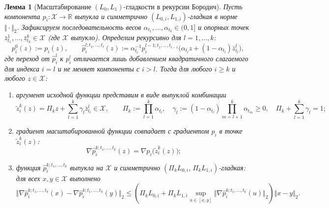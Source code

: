 \documentclass[11pt, a4paper]{article}
\newtheorem{lemma}{Лемма}[section]
\theoremstyle{definition}
\begin{document}
\begin{lemma}[Масштабирование $(L_0, L_1)$-гладкости в рекурсии Бородич]\label{lem:scaling_invariance}
Пусть компонента $p_i : \mathcal{X} \to \mathbb{R}$ выпукла и симметрично $(L_{0,i}, L_{1,i})$-гладкая в норме $\Vert \cdot \Vert_2$. Зафиксируем последовательность весов $\alpha_{t_1}, \dots, \alpha_{t_k} \in (0, 1]$ и опорных точек $\bar{z}_{t_1}^1, \dots, \bar{z}_{t_k}^k \in \mathcal{X}$ (где $\mathcal{X}$ выпукло). Определим рекурсивно для $l = 1, \dots, k$:
\[
p_i^{0}(z) := p_i(z), \qquad \hat{p}_i^{l; t_1, \dots, t_l}(z) := \alpha_{t_l}^{-1} p_i^{l-1; t_1, \dots, t_{l-1}}\big(\alpha_{t_l} z + (1 - \alpha_{t_l}) \bar{z}_{t_l}^l\big),
\]
где переход от $\hat{p}_i^{l}$ к $p_i^{l}$ отличается лишь добавлением квадратичного слагаемого для индекса $i = l$ и не меняет компоненты с $i > l$. Тогда для любого $i \ge k$ и любого $z \in \mathcal{X}$:
\begin{enumerate}
    \item аргумент исходной функции представим в виде выпуклой комбинации
    \begin{equation}\label{eq:convex_comb_tilde}
    \tilde{z}_i^k(z) = \Pi_k z + \sum_{l=1}^k \gamma_l \bar{z}_{t_l}^l \in \mathcal{X}, \qquad \Pi_k := \prod_{l=1}^k \alpha_{t_l}, \quad \gamma_l := (1 - \alpha_{t_l}) \prod_{m=l+1}^k \alpha_{t_m} \ge 0, \quad \Pi_k + \sum_{l=1}^k \gamma_l = 1;
    \end{equation}
    \item градиент масштабированной функции совпадает с градиентом $p_i$ в точке $\tilde{z}_i^k(z)$:
    \begin{equation}\label{eq:grad_chain_rule}
    \nabla \hat{p}_i^{k; t_1, \dots, t_k}(z) = \nabla p_i\big(\tilde{z}_i^k(z)\big);
    \end{equation}
    \item функция $\hat{p}_i^{k; t_1, \dots, t_k}$ выпукла на $\mathcal{X}$ и симметрично $(\Pi_k L_{0,i},\, \Pi_k L_{1,i})$-гладкая: для всех $x, y \in \mathcal{X}$ выполнено
    \begin{equation}\label{eq:scaled_l0l1}
    \Vert \nabla \hat{p}_i^{k; t_1, \dots, t_k}(x) - \nabla \hat{p}_i^{k; t_1, \dots, t_k}(y) \Vert_2 \le \left(\Pi_k L_{0,i} + \Pi_k L_{1,i} \sup_{u \in [x, y]} \Vert \nabla \hat{p}_i^{k; t_1, \dots, t_k}(u) \Vert_2\right) \Vert x - y \Vert_2.
    \end{equation}
\end{enumerate}
\end{lemma}
\end{document}
